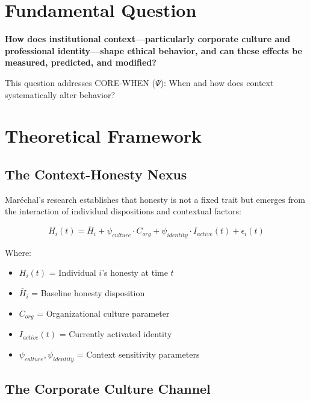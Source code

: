 \section{Fundamental Question}

\begin{tcolorbox}[colback=yellow!10!white,colframe=orange!75!black,title=Central Research Question]
\textbf{How does institutional context---particularly corporate culture and professional identity---shape ethical behavior, and can these effects be measured, predicted, and modified?}
\end{tcolorbox}

This question addresses CORE-WHEN ($\Psi$): When and how does context systematically alter behavior?

\section{Theoretical Framework}

\subsection{The Context-Honesty Nexus}

Maréchal's research establishes that honesty is not a fixed trait but emerges from the interaction of individual dispositions and contextual factors:

\begin{equation}
H_i(t) = \bar{H}_i + \psi_{culture} \cdot C_{org} + \psi_{identity} \cdot I_{active}(t) + \epsilon_i(t)
\end{equation}

Where:
\begin{itemize}
    \item $H_i(t)$ = Individual $i$'s honesty at time $t$
    \item $\bar{H}_i$ = Baseline honesty disposition
    \item $C_{org}$ = Organizational culture parameter
    \item $I_{active}(t)$ = Currently activated identity
    \item $\psi_{culture}, \psi_{identity}$ = Context sensitivity parameters
\end{itemize}

\subsection{The Corporate Culture Channel}

